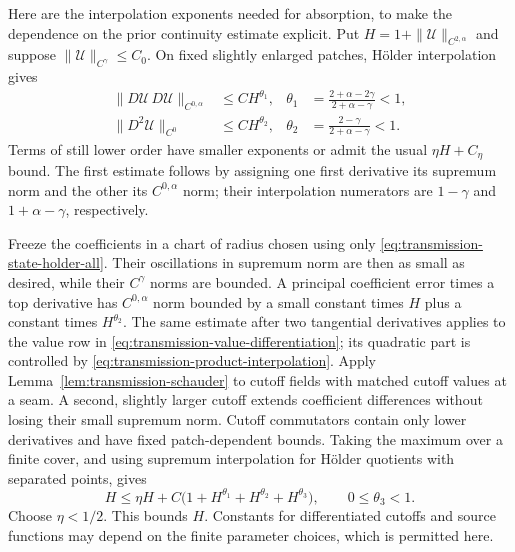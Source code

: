 Here are the interpolation exponents needed for absorption, to make
the dependence on the prior continuity estimate explicit.  Put
$H=1+\|\mathscr U\|_{C^{2,\alpha}}$ and suppose
$\|\mathscr U\|_{C^\gamma}\leq C_0$.  On fixed slightly enlarged
patches, H\"older interpolation gives
\begin{align}
 \|D\mathscr U\,D\mathscr U\|_{C^{0,\alpha}}
   &\leq C H^{\theta_1},
 &\theta_1&=\frac{2+\alpha-2\gamma}{2+\alpha-\gamma}<1,
 \label{eq:transmission-product-interpolation}\\
 \|D^2\mathscr U\|_{C^0}
   &\leq C H^{\theta_2},
 &\theta_2&=\frac{2-\gamma}{2+\alpha-\gamma}<1.
 \label{eq:transmission-sup-interpolation}
\end{align}
Terms of still lower order have smaller exponents or admit the usual
$\eta H+C_\eta$ bound.  The first estimate follows by assigning
one first derivative its supremum norm and the other its
$C^{0,\alpha}$ norm; their interpolation numerators are
$1-\gamma$ and $1+\alpha-\gamma$, respectively.

Freeze the coefficients in a chart of radius chosen using only
\eqref{eq:transmission-state-holder-all}.  Their oscillations in
supremum norm are then as small as desired, while their
$C^\gamma$ norms are bounded.  A principal coefficient error
times a top derivative has $C^{0,\alpha}$ norm bounded by a small
constant times $H$ plus a constant times $H^{\theta_2}$.
The same estimate after two tangential derivatives applies to the
value row in \eqref{eq:transmission-value-differentiation}; its
quadratic part is controlled by
\eqref{eq:transmission-product-interpolation}.  Apply
Lemma~\ref{lem:transmission-schauder} to cutoff fields with matched
cutoff values at a seam.  A second, slightly larger cutoff extends
coefficient differences without losing their small supremum norm.
Cutoff commutators contain only lower derivatives and have fixed
patch-dependent bounds.  Taking the maximum over a finite cover,
and using supremum interpolation for H\"older quotients with
separated points, gives
\begin{equation}
 H\leq \eta H+C\bigl(1+H^{\theta_1}+H^{\theta_2}
                         +H^{\theta_3}\bigr),\qquad
 0\leq\theta_3<1.
 \label{eq:transmission-global-absorption}
\end{equation}
Choose $\eta<1/2$.  This bounds $H$.  Constants for differentiated
cutoffs and source functions may depend on the finite parameter
choices, which is permitted here.

